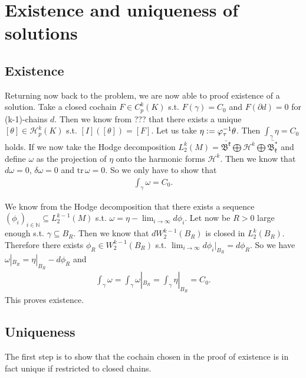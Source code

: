 \documentclass[12pt,a4paper]{article}
\theoremstyle{definition}
\begin{document}
\section{Existence and uniqueness of solutions}
\subsection{Existence}

Returning now back to the problem, we are now able to proof existence of a 
solution. Take a closed cochain $F \in C^k_p(K)$ s.t. $F(\gamma) = C_0$ and 
$F(\partial d) = 0$ for (k-1)-chains $d$. Then we know from ??? that 
there exists a unique $[\theta] \in \mathscr{H}_p^k(K)$ s.t. 
$[I]([\theta]) = [F]$. Let us take $\eta \vcentcolon= 
\varphi_\tau^{-1} \theta$. Then $\int_\gamma \eta = C_0$ holds. If we now take
the Hodge decomposition
$L^k_2(M) = \bar{\mathfrak{B^k}} \bigoplus \mathcal{H}^k \bigoplus
\bar{\mathfrak{B^*_k}}$ and define $\omega$ as the projection of $\eta$ onto the
harmonic forms $\mathcal{H}^k$. Then we know that $d\omega = 0$, 
$\delta\omega = 0$ and $\text{tr}\,\omega = 0$. So we only have to show that
\begin{align*}
\int_\gamma \omega = C_0.
\end{align*}

We know from the Hodge decomposition that there exists a sequence
$(\phi_i)_{i\in \mathbb{N}} \subseteq L^{k-1}_2(M)$ s.t. 
$\omega = \eta - \lim_{i \rightarrow \infty} d\phi_i$.
Let now be $R>0$ large enough s.t. $\gamma \subseteq B_R$. Then we know that
$d W^{k-1}_2(B_R)$ is closed in $L_2^k(B_R)$. Therefore there exists 
$\phi_R \in  W^{k-1}_2(B_R)$ s.t. 
$\lim_{i \rightarrow \infty} d\phi_i|_{B_R} = d\phi_R$. So we have
$\omega|_{B_R} = \eta|_{B_R} - d\phi_R$ and 
\begin{align*}
\int_\gamma \omega = \int_\gamma \omega|_{B_R} = \int_\gamma \eta|_{B_R} = C_0.
\end{align*}
This proves existence.

\subsection{Uniqueness}

The first step is to show that the cochain chosen in the proof of existence
is in fact unique if restricted to closed chains.
\end{document}
